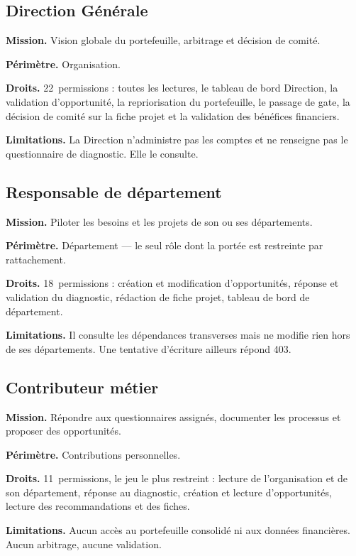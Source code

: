 \subsection{Direction Générale}

\textbf{Mission.} Vision globale du portefeuille, arbitrage et décision de comité.

\textbf{Périmètre.} Organisation.

\textbf{Droits.} 22~permissions : toutes les lectures, le tableau de bord Direction, la
validation d'opportunité, la repriorisation du portefeuille, le passage de gate,
la décision de comité sur la fiche projet et la validation des bénéfices financiers.

\textbf{Limitations.} La Direction n'administre pas les comptes et ne renseigne pas le
questionnaire de diagnostic. Elle le consulte.

\subsection{Responsable de département}

\textbf{Mission.} Piloter les besoins et les projets de son ou ses départements.

\textbf{Périmètre.} Département — le seul rôle dont la portée est restreinte par
rattachement.

\textbf{Droits.} 18~permissions : création et modification d'opportunités, réponse et
validation du diagnostic, rédaction de fiche projet, tableau de bord de département.

\textbf{Limitations.} Il consulte les dépendances transverses mais ne modifie rien hors
de ses départements. Une tentative d'écriture ailleurs répond 403.

\subsection{Contributeur métier}

\textbf{Mission.} Répondre aux questionnaires assignés, documenter les processus et
proposer des opportunités.

\textbf{Périmètre.} Contributions personnelles.

\textbf{Droits.} 11~permissions, le jeu le plus restreint : lecture de l'organisation et
de son département, réponse au diagnostic, création et lecture d'opportunités, lecture
des recommandations et des fiches.

\textbf{Limitations.} Aucun accès au portefeuille consolidé ni aux données financières.
Aucun arbitrage, aucune validation.

